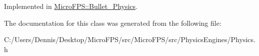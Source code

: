 Implemented in \hyperlink{class_micro_f_p_s_1_1_bullet___physics_aece8300cdd5ba7a0971cd3c30146d2af}{MicroFPS::Bullet\_\-Physics}.



The documentation for this class was generated from the following file:\begin{DoxyCompactItemize}
\item 
C:/Users/Dennis/Desktop/MicroFPS/src/MicroFPS/src/PhysicsEngines/Physics.h\end{DoxyCompactItemize}
